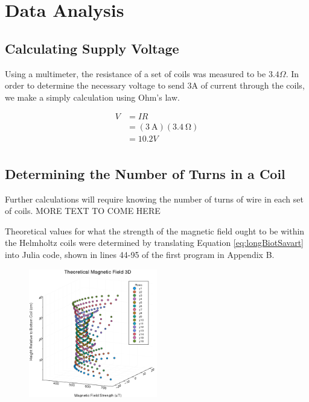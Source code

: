 \documentclass[a4paper]{article}
\begin{document}
\section{Data Analysis}


\subsection{Calculating Supply Voltage}

\qq Using a multimeter, the resistance of a set of coils was measured to be
$3.4 \Omega$. In order to determine the necessary voltage to send 3A of current
through the coils, we make a simply calculation using Ohm's law.

\begin{align*}
V &= IR \\
  &= (\SI{3}{\ampere})(\SI{3.4}{\ohm}) \\
  &= 10.2V \\
\end{align*}

\subsection{Determining the Number of Turns in a Coil}

\qq Further calculations will require knowing the number of turns of wire in each
set of coils. MORE TEXT TO COME HERE

\qq Theoretical values for what the strength of the magnetic field ought to be
within the Helmholtz coils were determined by translating Equation
\ref{eq:longBiotSavart} into Julia code, shown in lines 44-95 of the first
program in Appendix B. 

\begin{figure}[H]
\centering
\includegraphics[width=0.5\textwidth]{3DPlotTheoretical.png}
\label{Theoretical 3-D plot}
\end{figure}
\end{document}
